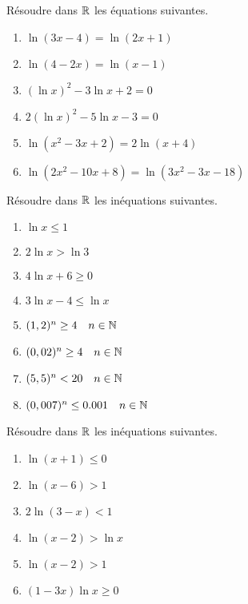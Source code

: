   \begin{exercice}
Résoudre dans $ \mathbb{R} $   les équations suivantes.
\begin{enumerate} 
\item $\ln (3x - 4) = \ln(2x + 1)$
\item $ \ln(4 - 2x) = \ln(x - 1)$
\item  $ (\ln x)^{2} - 3\ln x + 2 = 0$
\item $ 2(\ln x)^{2} - 5\ln x - 3 = 0$
\item $ \ln(x^{2} -3 x + 2) = 2\ln(x + 4)$
\item $  \ln(2x^{2} - 10x + 8) = \ln(3x^{2} - 3x - 18)$
\end{enumerate}

  \end{exercice}
 
   \begin{exercice}
    Résoudre dans $ \mathbb{R} $  les inéquations suivantes.
   
\begin{enumerate}
\item $ \ln x \leq1 $  
\item $ 2\ln x> \ln 3$  
\item  $ 4\ln x+6\geq0 $  
\item $ 3\ln x-4\leq\ln x$ 
\item  $( 1,2)^{n} \geq 4 \quad n\in\mathbb{N}$ 
\item  $( 0,02)^{n} \geq 4 \quad n\in\mathbb{N}$ 
\item  $( 5,5)^{n} < 20 \quad n\in\mathbb{N}$ 
\item  $( 0,007)^{n} \leq 0.001 \quad n\in\mathbb{N}$ 
\end{enumerate}

  \end{exercice}
  
  \begin{exercice}
Résoudre dans $ \mathbb{R} $  les inéquations suivantes.
   
\begin{enumerate}
\item $ \ln (x +1)\leq0 $  
\item $ \ln (x- 6)>1$   
\item $ 2\ln(3-x)<1$ 
\item  $ \ln(x-2)>\ln x $
\item  $ \ln(x-2)>1 $
\item $ (1-3x)\ln x\geq 0 $
\end{enumerate}

 \end{exercice}
 
